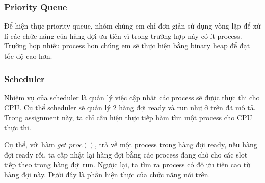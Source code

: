 \subsubsection{Priority Queue}

Để hiện thực priority queue, nhóm chúng em chỉ đơn giản sử dụng vòng lặp để xử lí các chức năng của hàng đợi ưu tiên vì trong trường hợp này có ít process. Trường hợp nhiều process hơn chúng em sẽ thực hiện bằng binary heap để đạt tốc độ cao hơn.




\subsubsection{Scheduler}

Nhiệm vụ của scheduler là quản lý việc cập nhật các process sẽ được thực thi cho CPU. Cụ thể scheduler sẽ quản lý 2 hàng đợi ready và run như ở trên đã mô tả. Trong assignment này, ta chỉ cần hiện thực tiếp hàm tìm một process cho CPU thực thi.

Cụ thể, với hàm $get\_proc()$, trả về một process trong hàng đợi ready, nếu hàng đợi ready rỗi, ta cấp nhật lại hàng đợi bằng các process đang chờ cho các slot tiếp theo trong hàng đợi run. Ngược lại, ta tìm ra process có độ ưu tiên cao từ hàng đợi này. Dưới đây là phần hiện thực của chức năng nói trên.

